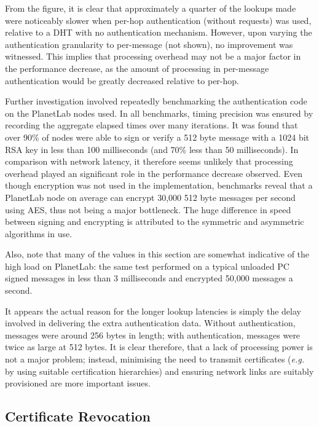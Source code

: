 \documentclass{elsart3p}
\begin{document}
From the figure, it is clear that approximately a quarter of the
lookups made were noticeably slower when per-hop authentication
(without requests) was used, relative to a DHT with no
authentication mechanism. However, upon varying the authentication
granularity to per-message (not shown), no improvement was
witnessed. This implies that processing overhead may not be a major
factor in the performance decrease, as the amount of processing in
per-message authentication would be greatly decreased relative to
per-hop.


Further investigation involved repeatedly benchmarking the
authentication code on the PlanetLab nodes used. In all benchmarks, timing
precision was ensured by recording the aggregate elapsed times over many iterations.
It was found that over 90\% of nodes were able to sign or verify a 512 byte message with a 1024 bit RSA key in less than
100 milliseconds (and 70\% less than 50 milliseconds). In comparison
with network latency, it therefore seems unlikely that processing
overhead played an significant role in the performance decrease
observed. Even though encryption was not used in the implementation,
benchmarks reveal that a PlanetLab node on average can encrypt 30,000 512 byte messages
per second using AES, thus not being a major bottleneck. The huge difference in speed between signing and encrypting is attributed to the symmetric and asymmetric algorithms in use.

Also, note that many of the values in this section are
somewhat indicative of the high load on PlanetLab: the same test
performed on a typical unloaded PC signed messages in less than 3
milliseconds and encrypted 50,000 messages a second.

It appears the actual reason for the longer lookup latencies is
simply the delay involved in delivering the extra authentication
data. Without authentication, messages were around 256 bytes in
length; with authentication, messages were twice as large at 512
bytes. It is clear therefore, that a lack of processing power is not
a major problem; instead, minimising the need to transmit
certificates (\emph{e.g.} by using suitable certification
hierarchies) and ensuring network links are suitably provisioned are
more important issues.

\subsection{Certificate Revocation}
\label{subsect-revocation}
\end{document}
